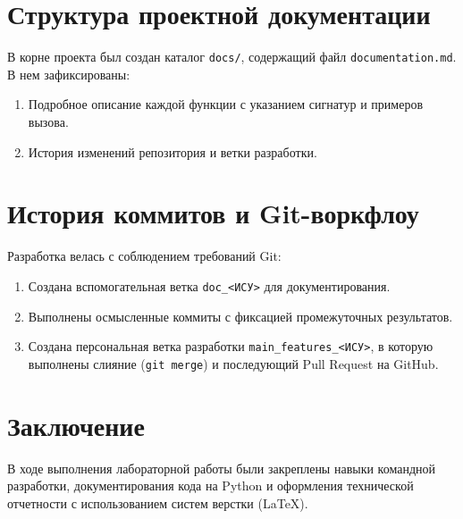 \documentclass[11pt, a4paper]{article}
\begin{document}
\section{Структура проектной документации}

В корне проекта был создан каталог \texttt{docs/}, содержащий файл \texttt{documentation.md}. В нем зафиксированы:
\begin{enumerate}
    \item Подробное описание каждой функции с указанием сигнатур и примеров вызова.
    \item История изменений репозитория и ветки разработки.
\end{enumerate}

\section{История коммитов и Git-воркфлоу}

Разработка велась с соблюдением требований Git:
\begin{enumerate}
    \item Создана вспомогательная ветка \texttt{doc\_<ИСУ>} для документирования.
    \item Выполнены осмысленные коммиты с фиксацией промежуточных результатов.
    \item Создана персональная ветка разработки \texttt{main\_features\_<ИСУ>}, в которую выполнены слияние (\texttt{git merge}) и последующий Pull Request на GitHub.
\end{enumerate}

\section{Заключение}
В ходе выполнения лабораторной работы были закреплены навыки командной разработки, документирования кода на Python и оформления технической отчетности с использованием систем верстки (LaTeX).
\end{document}
